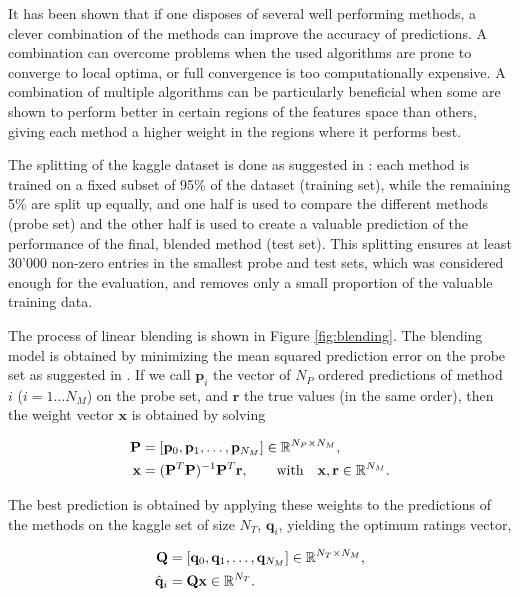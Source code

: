 It has been shown that if one disposes of several well performing methods,
a clever combination of the methods can improve the accuracy of predictions.   
A combination can overcome problems when the used algorithms are prone to
converge to local optima, or full convergence is too computationally expensive.
\cite{Dietterich}
A combination of multiple algorithms can be particularly beneficial when some
are shown to perform better in certain regions of the features space than
others, giving each method a higher weight in the regions where it performs
best.

The splitting of the kaggle dataset is done as suggested in
\cite{PresentationGrandPrize}: each method is trained on a fixed subset of 95\% of the
dataset (training set), while the remaining 5\% are split up equally, and one half is used to
compare the different methods (probe set) and the other half is used to create a
valuable prediction of the performance of the final, blended method (test set).  
This splitting ensures at least 30'000 non-zero entries in the smallest probe
and test sets,
which was considered enough for the evaluation, and removes only a small
proportion of the valuable training data.

The process of linear blending is shown in Figure \ref{fig:blending}. 
The blending model is obtained by minimizing the mean squared prediction error
on the probe set as suggested in \cite{PresentationGrandPrize}. 
If we call $\mathbf{p}_i$ the vector of $N_P$ ordered predictions of
method $i$ ($i = 1\ldots N_M$) on the
probe set, and $\mathbf{r}$ the true values (in the same order), then the weight vector
$\mathbf{x}$ is obtained by solving 

\begin{align}
  \mathbf{P} &=[\mathbf{p}_0, \mathbf{p}_1, \ldots, \mathbf{p}_{N_M}] \in\mathbb{R}^{N_P\times N_M}, \\
  \mathbf{x} &= (\mathbf{P}^T\mathbf{P})^{-1}\mathbf{P}^T\mathbf{r} ,\hspace{2em} \text{with} \hspace{1em}
  \mathbf{x},\mathbf{r}\in\mathbb{R}^{N_M}.
\end{align}

The best prediction is obtained by applying these weights to the predictions of
the methods on the kaggle set of size $N_T$, $\mathbf{q}_i$, yielding the optimum ratings
vector,

\begin{align}
  \mathbf{Q} &=[\mathbf{q}_0, \mathbf{q}_1, \ldots, \mathbf{q}_{N_M}]
  \in\mathbb{R}^{N_T\times N_M}, \\
  \hat{\mathbf{q}}_i &= \mathbf{Q}\mathbf{x} \in\mathbb{R}^{N_T}.
\end{align}

